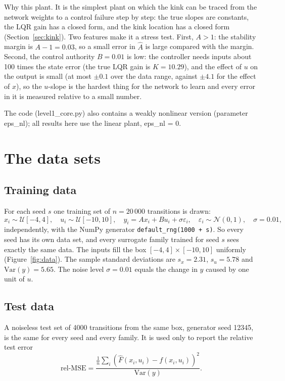 \documentclass[11pt]{article}
\begin{document}
Why this plant. It is the simplest plant on which the kink can be traced from the network weights to a control failure step by step: the true slopes are constants, the LQR gain has a closed form, and the kink location has a closed form (Section~\ref{sec:kink}). Two features make it a stress test. First, $A>1$: the stability margin is $A-1=0.03$, so a small error in $\hat A$ is large compared with the margin. Second, the control authority $B=0.01$ is low: the controller needs inputs about 100 times the state error (the true LQR gain is $K=10.29$), and the effect of $u$ on the output is small (at most $\pm 0.1$ over the data range, against $\pm 4.1$ for the effect of $x$), so the $u$-slope is the hardest thing for the network to learn and every error in it is measured relative to a small number.

The code (level1\_core.py) also contains a weakly nonlinear version (parameter eps\_nl); all results here use the linear plant, eps\_nl = 0.

\section{The data sets}\label{sec:data}

\subsection{Training data}
For each seed $s$ one training set of $n=20\,000$ transitions is drawn:
\begin{equation}
x_i \sim \mathcal U[-4,4],\quad u_i \sim \mathcal U[-10,10],\quad y_i = A x_i + B u_i + \sigma \varepsilon_i,\quad \varepsilon_i\sim\mathcal N(0,1),\quad \sigma = 0.01,
\end{equation}
independently, with the NumPy generator \texttt{default\_rng(1000 + s)}. So every seed has its own data set, and every surrogate family trained for seed $s$ sees exactly the same data. The inputs fill the box $[-4,4]\times[-10,10]$ uniformly (Figure~\ref{fig:data}). The sample standard deviations are $s_x=2.31$, $s_u=5.78$ and $\mathrm{Var}(y)=5.65$. The noise level $\sigma=0.01$ equals the change in $y$ caused by one unit of $u$.

\subsection{Test data}
A noiseless test set of 4000 transitions from the same box, generator seed 12345, is the same for every seed and every family. It is used only to report the relative test error
\begin{equation}
\text{rel-MSE} = \frac{\frac{1}{n}\sum_i (\hat F(x_i,u_i)-f(x_i,u_i))^2}{\mathrm{Var}(y)} .
\end{equation}
\end{document}
